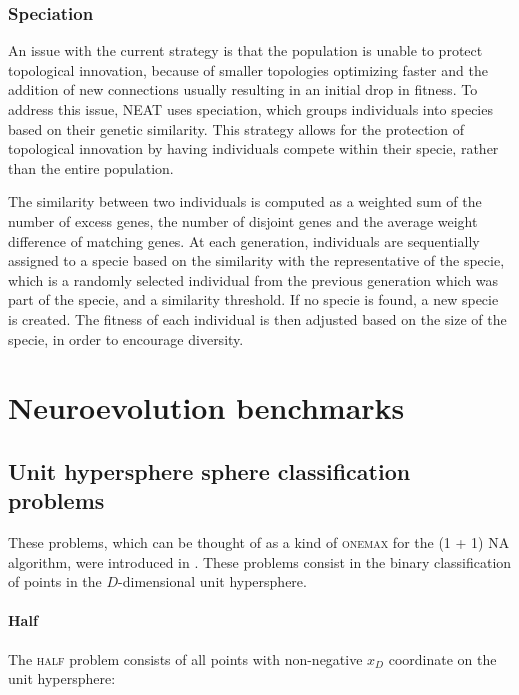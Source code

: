 
\subsubsection{Speciation}

An issue with the current strategy is that the population is unable to protect topological innovation, because of smaller topologies optimizing faster and the
addition of new connections usually resulting in an initial drop in fitness. To address this issue, NEAT uses speciation, which groups individuals into species based
on their genetic similarity. This strategy allows for the protection of topological innovation by having individuals compete within their specie, rather than the entire population.

The similarity between two individuals is computed as a weighted sum of the number of excess genes, the number of disjoint genes and the average weight difference
of matching genes. At each generation, individuals are sequentially assigned to a specie based on the similarity with the representative of the specie, which is
a randomly selected individual from the previous generation which was part of the specie, and a similarity threshold. If no specie is found, a new specie is created.
The fitness of each individual is then adjusted based on the size of the specie, in order to encourage diversity.


\section{Neuroevolution benchmarks}

\subsection{Unit hypersphere sphere classification problems}


These problems, which can be thought of as a kind of \textsc{onemax} for the (1 + 1) NA algorithm, were introduced in \cite{na}.
These problems consist in the binary classification of points in the $D$-dimensional unit hypersphere.

\paragraph{Half}
The \textsc{half} problem consists of all points with non-negative $x_D$ coordinate on the unit hypersphere:

